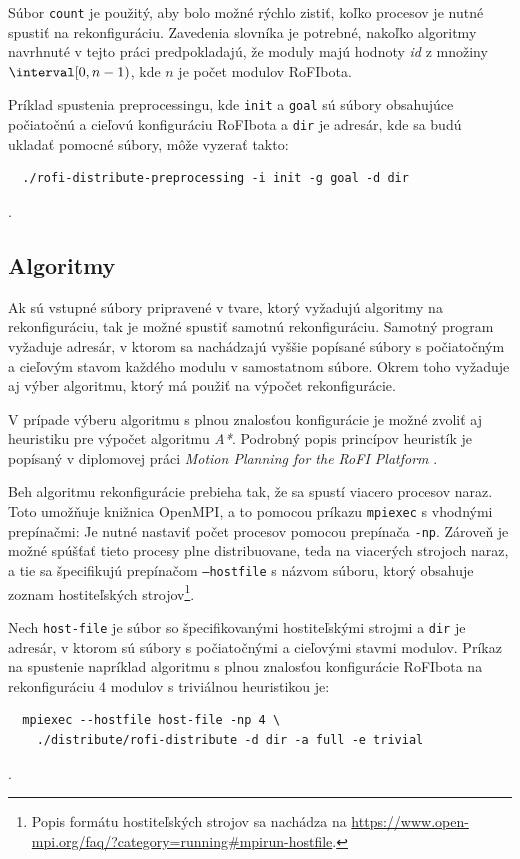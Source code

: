\documentclass[
  digital, %
  oneside, %
  notable,   %
  lof,     %
  nolot,     %
]{fithesis3}
\begin{document}
Súbor \texttt{count} je použitý, aby bolo možné rýchlo zistiť, koľko procesov je nutné spustiť na rekonfiguráciu. Zavedenia slovníka je potrebné, nakoľko algoritmy navrhnuté v tejto práci predpokladajú, že moduly majú hodnoty \textit{id} z množiny $\interval[0, n - 1)$, kde $n$ je počet modulov RoFIbota.

Príklad spustenia preprocessingu, kde \texttt{init} a \texttt{goal} sú súbory obsahujúce počiatočnú a cieľovú konfiguráciu RoFIbota a \texttt{dir} je adresár, kde sa budú ukladať pomocné súbory, môže vyzerať takto:

\begin{verbatim}
  ./rofi-distribute-preprocessing -i init -g goal -d dir
\end{verbatim}.

\subsection{Algoritmy}
Ak sú vstupné súbory pripravené v tvare, ktorý vyžadujú algoritmy na rekonfiguráciu, tak je možné spustiť samotnú rekonfiguráciu. Samotný program vyžaduje adresár, v ktorom sa nachádzajú vyššie popísané súbory s počiatočným a cieľovým stavom každého modulu v samostatnom súbore. Okrem toho vyžaduje aj výber algoritmu, ktorý má použiť na výpočet rekonfigurácie. 

V prípade výberu algoritmu s plnou znalosťou konfigurácie je možné zvoliť aj heuristiku pre výpočet algoritmu \textit{A*}. Podrobný popis princípov heuristík je popísaný v diplomovej práci \textit{Motion Planning for the RoFI Platform} \cite{vozarovaMasterThesis}. 

Beh algoritmu rekonfigurácie prebieha tak, že sa spustí viacero procesov naraz. Toto umožňuje knižnica OpenMPI, a to pomocou príkazu \texttt{mpiexec} s vhodnými prepínačmi: Je nutné nastaviť počet procesov pomocou prepínača \texttt{-np}. Zároveň je možné spúšťať tieto procesy plne distribuovane, teda na viacerých strojoch naraz, a tie sa špecifikujú prepínačom \texttt{--hostfile} s názvom súboru, ktorý obsahuje zoznam hostiteľských strojov\footnote{Popis formátu hostiteľských strojov sa nachádza na \url{https://www.open-mpi.org/faq/?category=running#mpirun-hostfile}.}. 

Nech \texttt{host-file} je súbor so špecifikovanými hostiteľskými strojmi a \texttt{dir} je adresár, v ktorom sú súbory s počiatočnými a cieľovými stavmi modulov. Príkaz na spustenie napríklad algoritmu s plnou znalosťou konfigurácie RoFIbota na rekonfiguráciu $4$ modulov s triviálnou heuristikou je: 
\begin{verbatim}
  mpiexec --hostfile host-file -np 4 \
    ./distribute/rofi-distribute -d dir -a full -e trivial
\end{verbatim}.
\end{document}
